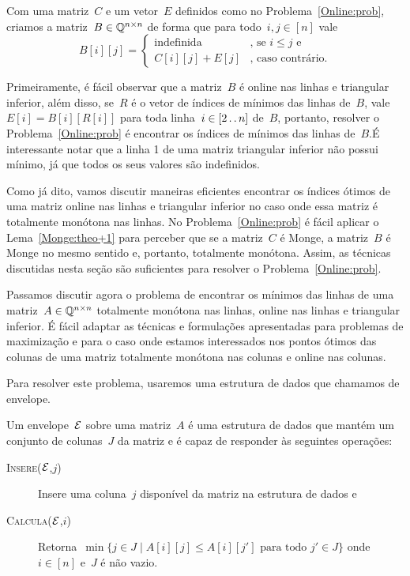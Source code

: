 Com uma matriz~$C$ e um vetor~$E$ definidos como no Problema~\ref{Online:prob}, criamos a matriz~$B \in \mathbb{Q}^{n \times n}$ de forma que para todo~$i,j \in [n]$ vale
\begin{equation} \label{Online:Bmat}
    B[i][j] = \begin{cases}
        \text{indefinida} & \text{, se } i \leq j \text{ e } \\
        C[i][j] + E[j]    & \text{, caso contrário.}
    \end{cases}
\end{equation}

Primeiramente, é fácil observar que a matriz~$B$ é online nas linhas e triangular inferior, além disso, se~$R$ é o vetor de índices de mínimos das linhas de~$B$, vale~$E[i] = B[i][R[i]]$ para toda linha~$i \in [2 \,.\,.\, n]$ de~$B$, portanto, resolver o Problema~\ref{Online:prob} é encontrar os índices de mínimos das linhas de~$B$.É interessante notar que a linha 1 de uma matriz triangular inferior não possui mínimo, já que todos os seus valores são indefinidos.

Como já dito, vamos discutir maneiras eficientes encontrar os índices ótimos de uma matriz online nas linhas e triangular inferior no caso onde essa matriz é totalmente monótona nas linhas. No Problema~\ref{Online:prob} é fácil aplicar o Lema~\ref{Monge:theo+1} para perceber que se a matriz~$C$ é Monge, a matriz~$B$ é Monge no mesmo sentido e, portanto, totalmente monótona. Assim, as técnicas discutidas nesta seção são suficientes para resolver o Problema~\ref{Online:prob}.

Passamos discutir agora o problema de encontrar os mínimos das linhas de uma matriz~$A \in \mathbb{Q}^{n \times n}$ totalmente monótona nas linhas, online nas linhas e triangular inferior. É fácil adaptar as técnicas e formulações apresentadas para problemas de maximização e para o caso onde estamos interessados nos pontos ótimos das colunas de uma matriz totalmente monótona nas colunas e online nas colunas.

Para resolver este problema, usaremos uma estrutura de dados que chamamos de envelope.

\begin{defi}
Um envelope~$\mathcal{E}$ sobre uma matriz~$A$ é uma estrutura de dados que mantém um conjunto de colunas~$J$ da matriz e é capaz de responder às seguintes operações:

\begin{description}
    \item[\textsc{Insere}($\mathcal{E}$,$j$)] Insere uma coluna~$j$ disponível da matriz na estrutura de dados e
    \item[\textsc{Calcula}($\mathcal{E}$,$i$)] Retorna~$\min\{j \in J \mid A[i][j] \leq A[i][j'] \text{ para todo } j' \in J\}$ onde~$i \in [n]$ e~$J$ é não vazio.
\end{description}
\end{defi}

